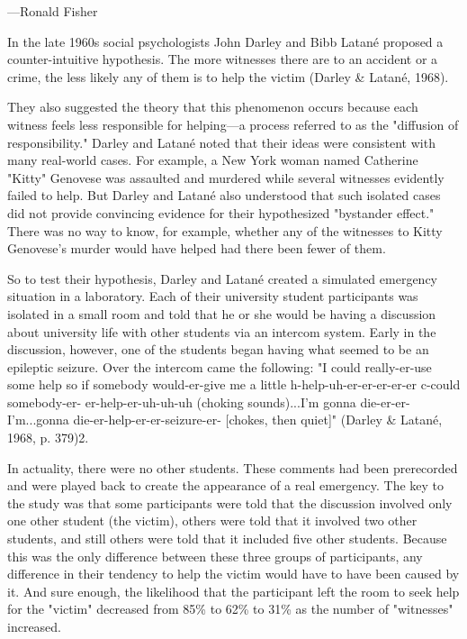  {---Ronald Fisher}

In the late 1960s social psychologists John Darley and Bibb Latané proposed a counter-intuitive hypothesis. The more witnesses there are to an accident or a crime, the less likely any of them is to help the victim (Darley \& Latané, 1968).

They also suggested the theory that this phenomenon occurs because each witness feels less responsible for helping---a process referred to as the "diffusion of responsibility." Darley and Latané noted that their ideas were consistent with many real-world cases. For example, a New York woman named Catherine "Kitty" Genovese was assaulted and murdered while several witnesses evidently failed to help. But Darley and Latané also understood that such isolated cases did not provide convincing evidence for their hypothesized "bystander effect." There was no way to know, for example, whether any of the witnesses to Kitty Genovese's murder would have helped had there been fewer of them.


So to test their hypothesis, Darley and Latané created a simulated emergency situation in a laboratory. Each of their university student participants was isolated in a small room and told that he or she would be having a discussion about university life with other students via an intercom system. Early in the discussion, however, one of the students began having what seemed to be an epileptic seizure. Over the intercom came the following: "I could really-er-use some help so if somebody would-er-give me a little h-help-uh-er-er-er-er-er c-could somebody-er- er-help-er-uh-uh-uh (choking sounds)...I'm gonna die-er-er-I'm...gonna die-er-help-er-er-seizure-er- [chokes, then quiet]" (Darley \& Latané, 1968, p. 379)2.


In actuality, there were no other students. These comments had been prerecorded and were played back to create the appearance of a real emergency. The key to the study was that some participants were told that the discussion involved only one other student (the victim), others were told that it involved two other students, and still others were told that it included five other students. Because this was the only difference between these three groups of participants, any difference in their tendency to help the victim would have to have been caused by it. And sure enough, the likelihood that the participant left the room to seek help for the "victim" decreased from 85\% to 62\% to 31\% as the number of "witnesses" increased.



